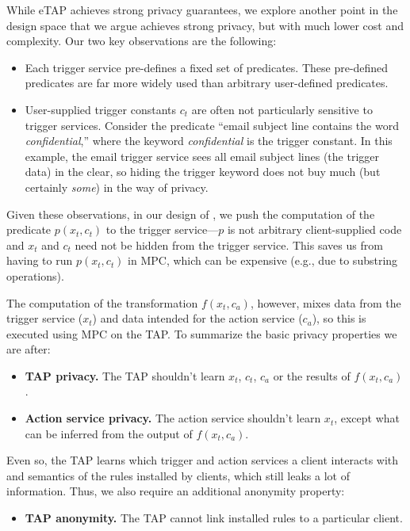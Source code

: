 While \textsf{eTAP} achieves strong privacy guarantees, we explore another point
in the design space that we argue achieves strong privacy, but with much lower
cost and complexity. Our two key observations are the following:
\begin{itemize}
  \item Each trigger service pre-defines a fixed set of predicates. These
    pre-defined predicates are far more widely used than arbitrary user-defined
    predicates.
  \item User-supplied trigger constants $c_t$ are often not particularly
    sensitive to trigger services. Consider the predicate ``email subject line
    contains the word \emph{confidential},'' where the keyword
    \emph{confidential} is the trigger constant. In this example, the email
    trigger service sees all email subject lines (the trigger data) in the
    clear, so hiding the trigger keyword does not buy much (but certainly
    \emph{some}) in the way of privacy.
\end{itemize}
Given these observations, in our design of \sys, we push the computation of the
predicate $p(x_t, c_t)$ to the trigger service---$p$ is not arbitrary
client-supplied code and $x_t$ and $c_t$ need not be hidden from the trigger
service. This saves us from having to run $p(x_t, c_t)$ in MPC, which can be
expensive (e.g., due to substring operations).

The computation of the transformation $f(x_t, c_a)$, however, mixes data from
the trigger service ($x_t$) and data intended for the action service ($c_a$), so
this is executed using MPC on the TAP. To summarize the basic privacy properties
we are after:
\begin{itemize}
  \item \textbf{TAP privacy.} The TAP shouldn't learn $x_t$, $c_t$, $c_a$ or the
    results of $f(x_t, c_a)$.
  \item \textbf{Action service privacy.} The action service shouldn't learn
    $x_t$, except what can be inferred from the output of $f(x_t, c_a)$.
\end{itemize}
Even so, the TAP learns which trigger and action services a client interacts
with and semantics of the rules installed by clients, which still leaks a lot of
information.  Thus, we also require an additional anonymity property:
\begin{itemize}
  \item \textbf{TAP anonymity.} The TAP cannot link installed rules to a
    particular client.
\end{itemize}


